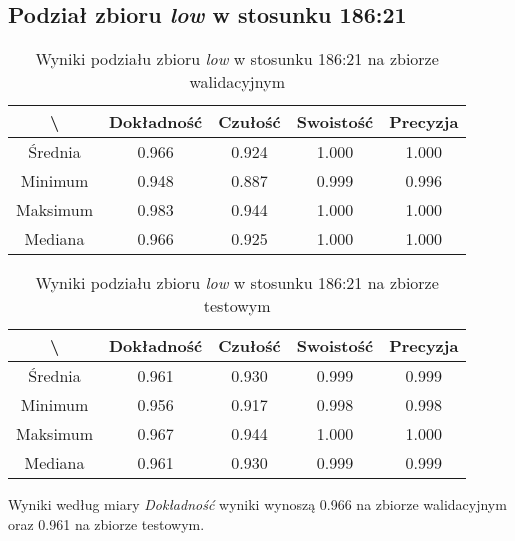 \subsection{Podział zbioru \textit{low} w stosunku 186:21}


\begin{table}[H]
	\centering
	\caption{Wyniki podziału zbioru \textit{low} w stosunku 186:21 na zbiorze walidacyjnym}
	\vspace{6pt}
	{\footnotesize
		\begin{tabular}{|c|c|c|c|c|}
      \hline \textbackslash & Dokładność & Czułość & Swoistość & Precyzja \\
      \hline Średnia & 0.966 & 0.924 & 1.000 & 1.000 \\
      \hline Minimum & 0.948 & 0.887 & 0.999 & 0.996 \\
      \hline Maksimum & 0.983 & 0.944 & 1.000 & 1.000 \\
      \hline Mediana & 0.966 & 0.925 & 1.000 & 1.000 \\
      \hline
    \end{tabular}
    \label{Tab:lowsplitb_val}
	}
	\vspace{0pt}
\end{table}

\begin{table}[H]
	\centering
	\caption{Wyniki podziału zbioru \textit{low} w stosunku 186:21 na zbiorze testowym}
	\vspace{6pt}
	{\footnotesize
		\begin{tabular}{|c|c|c|c|c|}
      \hline \textbackslash & Dokładność & Czułość & Swoistość & Precyzja \\
      \hline Średnia & 0.961 & 0.930 & 0.999 & 0.999 \\
      \hline Minimum & 0.956 & 0.917 & 0.998 & 0.998 \\
      \hline Maksimum & 0.967 & 0.944 & 1.000 & 1.000 \\
      \hline Mediana & 0.961 & 0.930 & 0.999 & 0.999 \\
      \hline
    \end{tabular}
    \label{Tab:lowsplitb_test}
	}
	\vspace{0pt}
\end{table}

Wyniki według miary \textit{Dokładność} wyniki wynoszą 0.966 na zbiorze walidacyjnym oraz 0.961 na zbiorze testowym.
